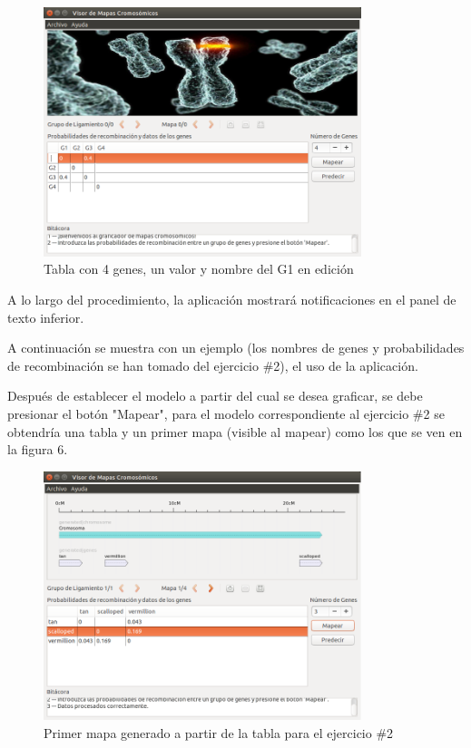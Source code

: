 \documentclass{article}
\begin{document}
	\begin{figure}[h!]
		\centering
			\includegraphics[width=350px, keepaspectratio=false]{report2}
				\caption{Tabla con 4 genes, un valor y nombre del G1 en edición}
	\end{figure}
	
	A lo largo del procedimiento, la aplicación mostrará notificaciones en el panel de texto inferior.
	
	A continuación se muestra con un ejemplo (los nombres de genes y probabilidades de recombinación se han tomado del ejercicio \#2), el uso de la aplicación.
	
	Después de establecer el modelo a partir del cual se desea graficar, se debe presionar el botón "Mapear", para el modelo correspondiente al ejercicio \#2 se obtendría una tabla y un primer mapa (visible al mapear) como los que se ven en la figura 6.
	
	\begin{figure}[h!]
		\centering
			\includegraphics[width=350px, keepaspectratio=false]{report3}
				\caption{Primer mapa generado a partir de la tabla para el ejercicio \#2}
	\end{figure}
	
\end{document}
